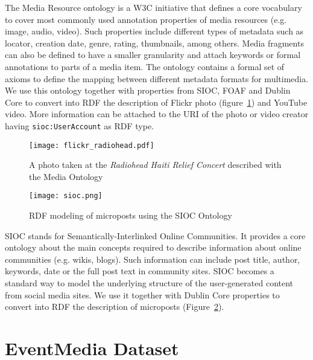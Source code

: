The Media Resource ontology is a W3C initiative that defines a core vocabulary to cover most commonly used annotation properties of media resources (e.g. image, audio, video). Such properties include different types of metadata such as locator, creation date, genre, rating, thumbnails, among others. Media fragments can also be defined to have a smaller granularity and attach keywords or formal annotations to parts of a media item. The ontology contains a formal set of axioms to define the mapping between different metadata formats for multimedia. We use this ontology together with properties from SIOC, FOAF and Dublin Core to convert into RDF the description of Flickr photo (figure~\ref{fig:flickr-model}) and YouTube video. More information can be attached to the URI of the photo or video creator having \texttt{sioc:UserAccount} as RDF type.
 
\begin{figure}[htb]
  \centering
  \texttt{[image: flickr\_radiohead.pdf]}
  \caption{A photo taken at the \emph{Radiohead Haiti Relief Concert} described with the Media Ontology}
  \label{fig:flickr-model}
\end{figure}

\begin{figure}[htb]
  \centering
  \texttt{[image: sioc.png]}
  \caption{RDF modeling of microposts using the SIOC Ontology}
  \label{fig:sioc-model}
\end{figure}

SIOC stands for Semantically-Interlinked Online Communities. It provides a core ontology about the main concepts required to describe information about online communities (e.g. wikis, blogs). Such information can include post title, author, keywords, date or the full post text in community sites. SIOC becomes a standard way to model the underlying structure of the user-generated content from social media sites. We use it together with Dublin Core properties to convert into RDF the description of microposts (Figure~\ref{fig:sioc-model}).

\vspace*{2mm}
\section{EventMedia Dataset}		\label{sec:eventmedia-dataset}

